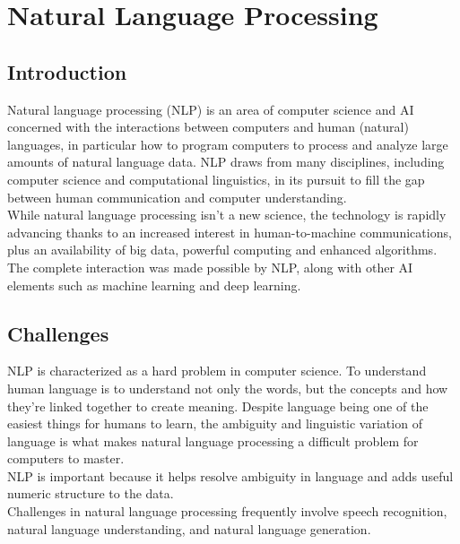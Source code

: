 \section{Natural Language Processing}
\label{chap:Natural Language Processing}

\subsection{Introduction}
Natural language processing (NLP) is an area of computer science and AI concerned with the interactions between computers and human (natural) languages, in particular how to program computers to process and analyze large amounts of natural language data. NLP draws from many disciplines, including computer science and computational linguistics, in its pursuit to fill the gap between human communication and computer understanding.\cite{web011}\\
While natural language processing isn’t a new science, the technology is rapidly advancing thanks to an increased interest in human-to-machine communications, plus an availability of big data, powerful computing and enhanced algorithms. The complete interaction was made possible by NLP, along with other AI elements such as machine learning and deep learning.\\
\subsection{Challenges}
NLP is characterized as a hard problem in computer science. To understand human language is to understand not only the words, but the concepts and how they’re linked together to create meaning. Despite language being one of the easiest things for humans to learn, the ambiguity and linguistic variation of language is what makes natural language processing a difficult problem for computers to master.\\ NLP is important because it helps resolve ambiguity in language and adds useful numeric structure to the data.\\
Challenges in natural language processing frequently involve speech recognition, natural language understanding, and natural language generation.\\
